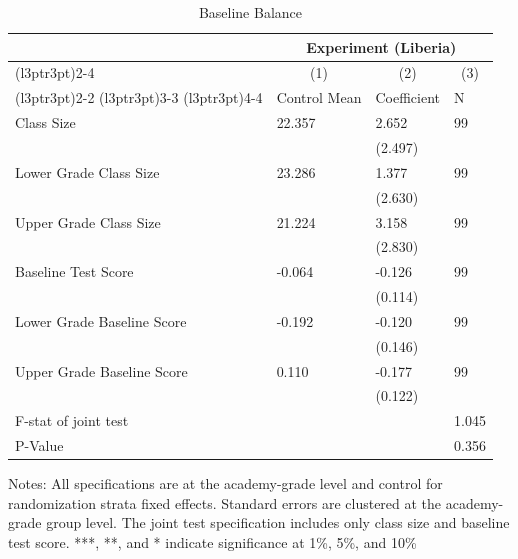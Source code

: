 \begin{table}[!h]
\centering
\caption{Baseline Balance}
\centering
\begin{threeparttable}
\begin{tabular}[t]{llll}
\toprule
\multicolumn{1}{c}{ } & \multicolumn{3}{c}{Experiment (Liberia)} \\
\cmidrule(l{3pt}r{3pt}){2-4}
\multicolumn{1}{c}{ } & \multicolumn{1}{c}{(1)} & \multicolumn{1}{c}{(2)} & \multicolumn{1}{c}{(3)} \\
\cmidrule(l{3pt}r{3pt}){2-2} \cmidrule(l{3pt}r{3pt}){3-3} \cmidrule(l{3pt}r{3pt}){4-4}
 & Control Mean & Coefficient & N\\
\midrule
Class Size & 22.357 & 2.652 & 99\\
 &  & (2.497) & \\
Lower Grade Class Size & 23.286 & 1.377 & 99\\
 &  & (2.630) & \\
Upper Grade Class Size & 21.224 & 3.158 & 99\\
 &  & (2.830) & \\
Baseline Test Score & -0.064 & -0.126 & 99\\
 &  & (0.114) & \\
Lower Grade Baseline Score & -0.192 & -0.120 & 99\\
 &  & (0.146) & \\
Upper Grade Baseline Score & 0.110 & -0.177 & 99\\
 &  & (0.122) & \\
\hline
\midrule
F-stat of joint test &  &  & 1.045\\
P-Value &  &  & 0.356\\
\bottomrule
\end{tabular}
\begin{tablenotes}[para]
\item Notes: All specifications are at the academy-grade level and control for randomization strata fixed effects. Standard errors are clustered at the academy-grade group level. The joint test specification includes only class size and baseline test score. ***, **, and * indicate significance at 1\%, 5\%, and 10\%
\end{tablenotes}
\end{threeparttable}
\end{table}
